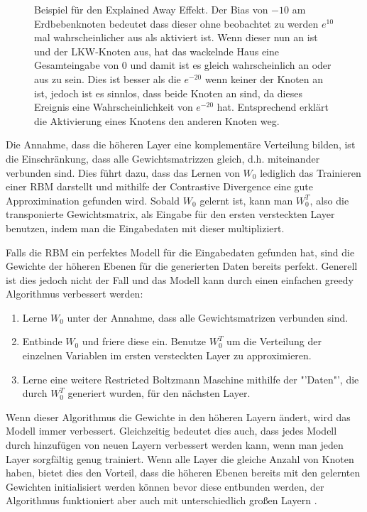 \documentclass[12pt]{article}
\begin{document}
\begin{figure}[H]
	\center
	
	\caption{Beispiel für den Explained Away Effekt. Der Bias von $-10$ am Erdbebenknoten bedeutet dass dieser ohne beobachtet zu werden $e^10$ mal wahrscheinlicher aus als aktiviert ist. Wenn dieser nun an ist und der LKW-Knoten aus, hat das wackelnde Haus eine Gesamteingabe von 0 und damit ist es gleich wahrscheinlich an oder aus zu sein. Dies ist besser als die $e^{-20}$ wenn keiner der Knoten an ist, jedoch ist es sinnlos, dass beide Knoten an sind, da dieses Ereignis eine Wahrscheinlichkeit von $e^{-20}$ hat. Entsprechend erklärt die Aktivierung eines Knotens den anderen Knoten weg.}
	\label{ExplainedAway}
\end{figure}

Die Annahme, dass die höheren Layer eine komplementäre Verteilung bilden, ist die Einschränkung, dass alle Gewichtsmatrizzen gleich, d.h. miteinander verbunden sind. Dies führt dazu, dass das Lernen von $W_0$ lediglich das Trainieren einer RBM darstellt und mithilfe der Contrastive Divergence eine gute Approximination gefunden wird. Sobald $W_0$ gelernt ist, kann man $W^T_0$, also die transponierte Gewichtsmatrix, als Eingabe für den ersten versteckten Layer benutzen, indem man die Eingabedaten mit dieser multipliziert.

Falls die RBM ein perfektes Modell für die Eingabedaten gefunden hat, sind die Gewichte der höheren Ebenen für die generierten Daten bereits perfekt. Generell ist dies jedoch nicht der Fall und das Modell kann durch einen einfachen greedy Algorithmus verbessert werden:
 
\begin{enumerate}
\item Lerne $W_0$ unter der Annahme, dass alle Gewichtsmatrizen verbunden sind.
\item Entbinde $W_0$ und friere diese ein. Benutze $W_0^T$ um die Verteilung der einzelnen Variablen im ersten versteckten Layer zu approximieren.
\item Lerne eine weitere Restricted Boltzmann Maschine  mithilfe der "'Daten"', die durch $W_0^T$ generiert wurden, für den nächsten Layer.
\end{enumerate}

Wenn dieser Algorithmus die Gewichte in den höheren Layern ändert, wird das Modell immer verbessert. Gleichzeitig bedeutet dies auch, dass jedes Modell durch hinzufügen von neuen Layern verbessert werden kann, wenn man jeden Layer sorgfältig genug trainiert. Wenn alle Layer die gleiche Anzahl von Knoten haben, bietet dies den Vorteil, dass die höheren Ebenen bereits mit den gelernten Gewichten initialisiert werden können bevor diese entbunden werden, der Algorithmus funktioniert aber auch mit unterschiedlich großen Layern \cite{learning}.
\end{document}
